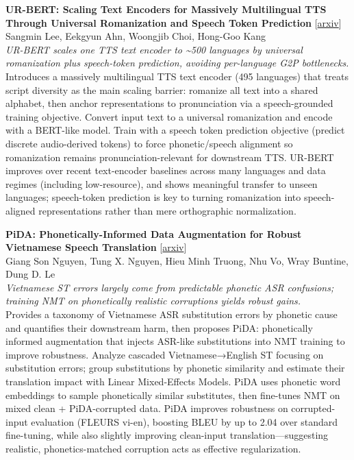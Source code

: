 \documentclass[12pt,letterpaper]{article}
\begin{document}
{\small\textbf{UR-BERT: Scaling Text Encoders for Massively Multilingual TTS Through Universal Romanization and Speech Token Prediction}} {\scriptsize[\href{https://arxiv.org/abs/2606.11681}{arxiv}]}\\
{\scriptsize Sangmin Lee, Eekgyun Ahn, Woongjib Choi, Hong-Goo Kang}\\

{\small\textit{UR-BERT scales one TTS text encoder to \textasciitilde{}500 languages by universal romanization plus speech-token prediction, avoiding per-language G2P bottlenecks.}}\\[1pt]
{\footnotesize Introduces a massively multilingual TTS text encoder (495 languages) that treats script diversity as the main scaling barrier: romanize all text into a shared alphabet, then anchor representations to pronunciation via a speech-grounded training objective. Convert input text to a universal romanization and encode with a BERT-like model. Train with a speech token prediction objective (predict discrete audio-derived tokens) to force phonetic/speech alignment so romanization remains pronunciation-relevant for downstream TTS. UR-BERT improves over recent text-encoder baselines across many languages and data regimes (including low-resource), and shows meaningful transfer to unseen languages; speech-token prediction is key to turning romanization into speech-aligned representations rather than mere orthographic normalization.}

\medskip

{\small\textbf{PiDA: Phonetically-Informed Data Augmentation for Robust Vietnamese Speech Translation}} {\scriptsize[\href{https://arxiv.org/abs/2606.12911}{arxiv}]}\\
{\scriptsize Giang Son Nguyen, Tung X. Nguyen, Hieu Minh Truong, Nhu Vo, Wray Buntine, Dung D. Le}\\

{\small\textit{Vietnamese ST errors largely come from predictable phonetic ASR confusions; training NMT on phonetically realistic corruptions yields robust gains.}}\\[1pt]
{\footnotesize Provides a taxonomy of Vietnamese ASR substitution errors by phonetic cause and quantifies their downstream harm, then proposes PiDA: phonetically informed augmentation that injects ASR-like substitutions into NMT training to improve robustness. Analyze cascaded Vietnamese→English ST focusing on substitution errors; group substitutions by phonetic similarity and estimate their translation impact with Linear Mixed-Effects Models. PiDA uses phonetic word embeddings to sample phonetically similar substitutes, then fine-tunes NMT on mixed clean + PiDA-corrupted data. PiDA improves robustness on corrupted-input evaluation (FLEURS vi-en), boosting BLEU by up to 2.04 over standard fine-tuning, while also slightly improving clean-input translation---suggesting realistic, phonetics-matched corruption acts as effective regularization.}
\end{document}
